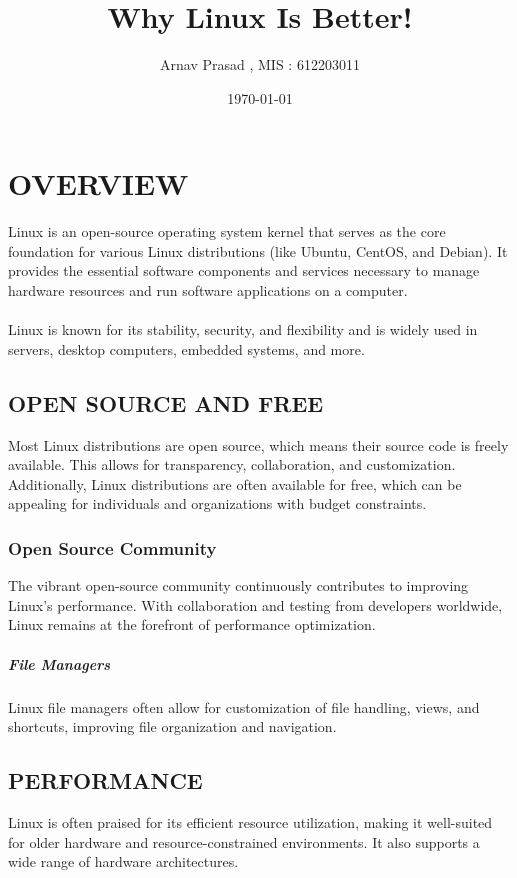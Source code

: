 \documentclass{article}
\begin{document}
\title{Why Linux Is Better!}
\author{Arnav Prasad , MIS : 612203011}
\date{\today}
\maketitle


\newpage

\section{OVERVIEW}

Linux is an open-source operating system kernel that serves as the core foundation for various Linux distributions (like Ubuntu, CentOS, and Debian). It provides the essential software components and services necessary to manage hardware resources and run software applications on a computer. 
\paragraph{}
Linux is known for its stability, security, and flexibility and is widely used in servers, desktop computers, embedded systems, and more.

\subsection{OPEN SOURCE AND FREE}
 Most Linux distributions are open source, which means their source code is freely available. This allows for transparency, collaboration, and customization. Additionally, Linux distributions are often available for free, which can be appealing for individuals and organizations with budget constraints.

\subsubsection{Open Source Community}
The vibrant open-source community continuously contributes to improving Linux's performance. With collaboration and testing from developers worldwide, Linux remains at the forefront of performance optimization.

\subparagraph{File Managers}
Linux file managers often allow for customization of file handling, views, and shortcuts, improving file organization and navigation.

\subsection{PERFORMANCE}
Linux is often praised for its efficient resource utilization, making it well-suited for older hardware and resource-constrained environments. It also supports a wide range of hardware architectures.
\end{document}
